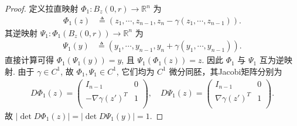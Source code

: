 \documentclass[../../main.tex]{subfiles}
\begin{document}
\begin{proof}
定义拉直映射 \(\Phi_1: B_z(0, r) \to \mathbb{R}^n\) 为
\begin{align*}
\Phi_1(z) &\triangleq (z_1, \cdots, z_{n-1}, z_n - \gamma(z_1, \cdots, z_{n-1})).
\end{align*}
其逆映射 \(\Psi_1: \Phi_1(B_z(0, r)) \to \mathbb{R}^n\) 为
\begin{align*}
\Psi_1(y) &\triangleq (y_1, \cdots, y_{n-1}, y_n + \gamma(y_1, \cdots, y_{n-1})).
\end{align*}
直接计算可得 \(\Phi_1(\Psi_1(y)) = y\), 且 \(\Psi_1(\Phi_1(z)) = z\). 因此 \(\Phi_1\) 与 \(\Psi_1\) 互为逆映射. 由于 \(\gamma \in C^1\), 故 \(\Phi_1, \Psi_1 \in C^1\), 它们均为 \(C^1\) 微分同胚，其Jacobi矩阵分别为
\begin{align*}
D\Phi _1\left( z \right) =\left( \begin{matrix}
I_{n-1}&		0\\
-\nabla \gamma \left( z' \right) ^T&		1\\
\end{matrix} \right) ,\quad D\Psi _1\left( z \right) =\left( \begin{matrix}
I_{n-1}&		0\\
\nabla \gamma \left( z' \right) ^T&		1\\
\end{matrix} \right) .
\end{align*}
故 \(\left| \det D\Phi _1(z) \right|=\left| \det D\Psi _1(y) \right|=1\).


\end{proof}
\end{document}
